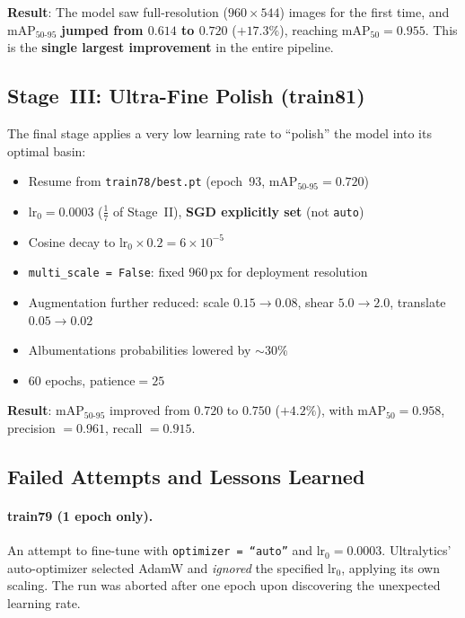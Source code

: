 \documentclass[12pt, titlepage]{article}
\begin{document}
\noindent\textbf{Result}: The model saw full-resolution
($960\times544$) images for the first time, and mAP$_{50\text{-}95}$ \textbf{jumped
  from $0.614$ to $0.720$} ($+17.3\%$), reaching
mAP$_{50} = 0.955$.  This is the \textbf{single largest improvement}
in the entire pipeline.

\subsection{Stage~III: Ultra-Fine Polish (train81)}
\label{sec:stage3}

The final stage applies a very low learning rate to ``polish'' the model into
its optimal basin:

\begin{itemize}[leftmargin=*, itemsep=2pt]
  \item Resume from \texttt{train78/best.pt} (epoch~93, mAP$_{50\text{-}95} = 0.720$)
  \item $\text{lr}_0 = 0.0003$ ($\frac{1}{7}$ of Stage~II),
        \textbf{SGD explicitly set} (not \texttt{auto})
  \item Cosine decay to $\text{lr}_0 \times 0.2 = 6 \times 10^{-5}$
  \item \texttt{multi\_scale = False}: fixed $960$\,px for deployment
        resolution
  \item Augmentation further reduced: scale $0.15 \to 0.08$, shear $5.0 \to 2.0$,
        translate $0.05 \to 0.02$
  \item Albumentations probabilities lowered by ${\sim}30\%$
  \item 60 epochs, patience$= 25$
\end{itemize}

\noindent\textbf{Result}: mAP$_{50\text{-}95}$ improved from $0.720$ to
$\mathbf{0.750}$ ($+4.2\%$), with mAP$_{50} = 0.958$,
precision $= 0.961$, recall $= 0.915$.

\subsection{Failed Attempts and Lessons Learned}
\label{sec:failures}

\paragraph{train79 (1 epoch only).}  An attempt to fine-tune with \texttt{optimizer = ``auto''} and $\text{lr}_0 =
  0.0003$. Ultralytics' auto-optimizer selected AdamW and \emph{ignored} the
specified $\text{lr}_0$, applying its own scaling. The run was aborted after
one epoch upon discovering the unexpected learning rate.
\end{document}
